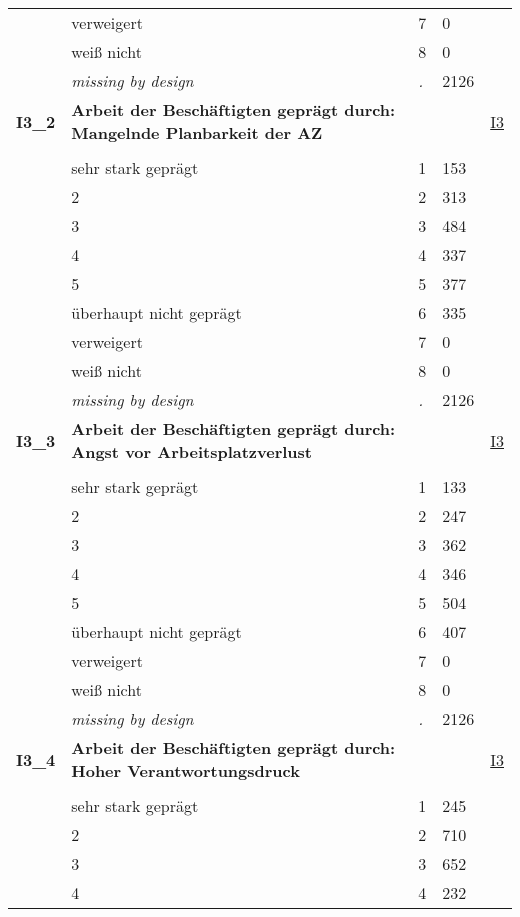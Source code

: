 \begin{longtable}{| L{2.65cm} | L{8cm} | C{1.5cm} | R{1.25cm} | C{2.25cm}  |}
   & verweigert & 7 & 0 &  \\ 
   & weiß nicht & 8 & 0 &  \\ 
   & \textit{missing by design} & \textit{.} & 2126 &  \\ 
   \midrule
\textbf{I3\_2}\label{var:I3:2} & \textbf{Arbeit der Beschäftigten geprägt durch: Mangelnde Planbarkeit der AZ} &  &  & \hyperref[I3]{I3} \\ 
   &  &  &  &  \\ 
   & sehr stark geprägt & 1 & 153 &  \\ 
   & 2 & 2 & 313 &  \\ 
   & 3 & 3 & 484 &  \\ 
   & 4 & 4 & 337 &  \\ 
   & 5 & 5 & 377 &  \\ 
   & überhaupt nicht geprägt & 6 & 335 &  \\ 
   & verweigert & 7 & 0 &  \\ 
   & weiß nicht & 8 & 0 &  \\ 
   & \textit{missing by design} & \textit{.} & 2126 &  \\ 
   \midrule
\textbf{I3\_3}\label{var:I3:3} & \textbf{Arbeit der Beschäftigten geprägt durch: Angst vor Arbeitsplatzverlust} &  &  & \hyperref[I3]{I3} \\ 
   &  &  &  &  \\ 
   & sehr stark geprägt & 1 & 133 &  \\ 
   & 2 & 2 & 247 &  \\ 
   & 3 & 3 & 362 &  \\ 
   & 4 & 4 & 346 &  \\ 
   & 5 & 5 & 504 &  \\ 
   & überhaupt nicht geprägt & 6 & 407 &  \\ 
   & verweigert & 7 & 0 &  \\ 
   & weiß nicht & 8 & 0 &  \\ 
   & \textit{missing by design} & \textit{.} & 2126 &  \\ 
   \midrule
\textbf{I3\_4}\label{var:I3:4} & \textbf{Arbeit der Beschäftigten geprägt durch: Hoher Verantwortungsdruck} &  &  & \hyperref[I3]{I3} \\ 
   &  &  &  &  \\ 
   & sehr stark geprägt & 1 & 245 &  \\ 
   & 2 & 2 & 710 &  \\ 
   & 3 & 3 & 652 &  \\ 
   & 4 & 4 & 232 &  \\ 

\end{longtable}

